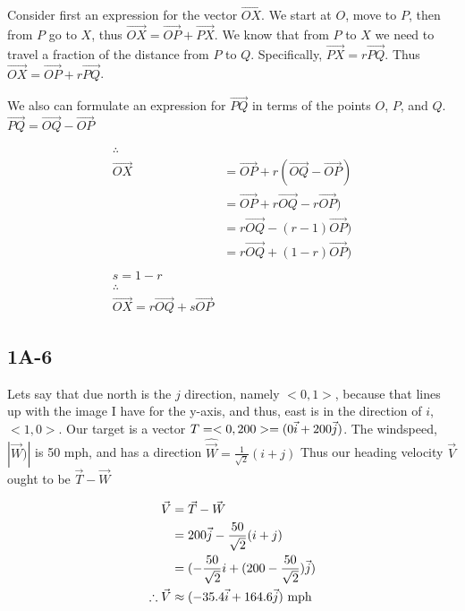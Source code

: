     Consider first an expression for the vector $\vec{OX}$. 
    We start at $O$, move to $P$, then from $P$ go to $X$, 
    thus $\vec{OX} = \vec{OP} + \vec{PX}$. 
    We know that from $P$ to $X$ we need to travel a fraction of the 
    distance from $P$ to $Q$. Specifically, $\vec{PX} = r\vec{PQ}$.
    Thus $\vec{OX} = \vec{OP} + r\vec{PQ}$.

    We also can formulate an expression for $\vec{PQ}$ in terms 
    of the points $O$, $P$, and $Q$. $\vec{PQ} = \vec{OQ} - \vec{OP}$ 
    

    \begin{align*}
    \therefore\\
        \vec{OX} &= \vec{OP} + r(\vec{OQ} - \vec{OP})\\
        &= \vec{OP} + r\vec{OQ} - r\vec{OP})\\
        &= r\vec{OQ} - (r-1)\vec{OP})\\
        &= r\vec{OQ} + (1-r)\vec{OP})\\
        \\
        s = 1 - r\\
        \therefore\\
        \vec{OX} = r\vec{OQ} + s\vec{OP}
    \end{align*}

\subsection*{1A-6}

Lets say that due north is the $j$ direction, namely $<0,1>$, 
because that lines up with the image I have for the y-axis, and 
thus, east is in the direction of $i$, $<1,0>$.
Our target is a vector $T = <0, 200> = (0\vec{i} + 200\vec{j})$. 
The windspeed, $|\vec{W})|$ is 50 mph, and has a direction $\hat{\vec
{W}} = \frac{1}{\sqrt{2}}(i + j)$
Thus our heading velocity $\vec{V}$ ought to be $\vec{T} - \vec{W}$

\begin{align}
\vec{V} &= \vec{T} - \vec{W}\\
&= 200\vec{j} - \frac{50}{\sqrt{2}}(i+j)\\
&= (- \frac{50}{\sqrt{2}}i + (200  - \frac{50}{\sqrt{2}}) \vec{j})\\
\therefore \vec{V} &\approx (- 35.4 \vec{i} + 164.6 \vec{j})\ \text{mph}
\end{align}



